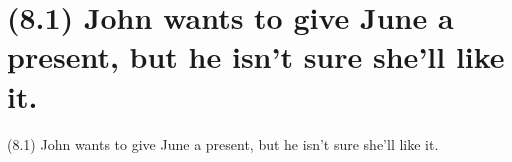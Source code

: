 \documentclass{article}
\begin{document}
\clearpage

%
%

\section*{(8.1) John wants to give June a present, but he isn't sure she’ll like it.}

\bigbreak
\begin{enumerate*}
\item[(8.1)] John wants to give June a present, but he isn't sure she’ll like it.
\end{enumerate*}
\bigbreak
\end{document}
